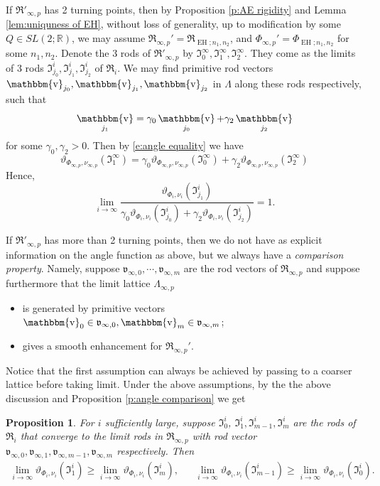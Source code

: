\documentclass[a4paper,11pt]{amsart}
\newtheorem{proposition}[theorem]{Proposition}
\theoremstyle{definition}
\numberwithin{equation}{section}
\newcommand{\R}{\mathbb{R}}
\newcommand{\mv} {\mathfrak v}
\newcommand{\mI} {\mathfrak I}
\newcommand{\mR} {\mathfrak R}
\DeclareMathOperator{\bbv}{\mathbbm{v}}
\DeclareMathOperator{\EH}{EH}
\begin{document}
If  $\mR'_{\infty, p}$ has 2 turning points, then  by Proposition \ref{p:AE rigidity} and Lemma \ref{lem:uniquness of EH}, without loss of generality, up to modification by some $Q\in SL(2;\R)$, we may assume $\mR_{\infty, p}'=\mR_{\EH; n_1, n_2}$, and $\Phi_{\infty,p}'=\Phi_{\EH;n_1, n_2}$ for some $n_1, n_2$.    Denote the 3 rods of $\mR'_{\infty, p}$ by $\mI^\infty_0, \mI^\infty_1, \mI^\infty_2$. They come as the limits of 3 rods $\mI_{j_0}^i, \mI_{j_1}^i, \mI_{j_2}^i$ of $\mR_i$. We may find primitive rod vectors $\bbv_{j_0}, \bbv_{j_1}, \bbv_{j_2}$ in $\Lambda$ along these rods respectively, such that 
\begin{equation}\label{e:primitive vector relations}
    \bbv_{j_1}=\gamma_0\bbv_{j_0}+\gamma_2\bbv_{j_2}
\end{equation}
for some $\gamma_0, \gamma_2>0$. Then by \eqref{e:angle equality} we have 
\begin{equation}
\vartheta_{\Phi_{\infty,p}, \nu_{\infty, p}}(\mI^\infty_1)=\gamma_0\vartheta_{\Phi_{\infty,p}, \nu_{\infty, p}}(\mI^\infty_0)+\gamma_2\vartheta_{\Phi_{\infty,p}, \nu_{\infty, p}}(\mI^\infty_2)
\end{equation}
Hence,
\begin{equation}\label{e:angle equality before limit}
    \lim_{i\rightarrow\infty}\frac{\vartheta_{\Phi_i, \nu_i}(\mI_{j_1}^i)}{\gamma_0\vartheta_{\Phi_i, \nu_i}(\mI_{j_0}^i)+\gamma_2\vartheta_{\Phi_i, \nu_i}(\mI_{j_2}^i)}=1.
\end{equation}

If $\mR'_{\infty, p}$ has more than 2 turning points, then we do not have as explicit information on the angle function as above, but we always  have a \emph{comparison property}. Namely, suppose $\mv_{\infty, 0}, \cdots, \mv_{\infty, m}$ are the rod vectors of $\mR_{\infty, p}$ and suppose furthermore that the 
limit lattice $\Lambda_{\infty,p}$ 
\begin{itemize}
    \item is generated by primitive vectors $\bbv_{0}\in\mv_{\infty,0},\bbv_{m}\in\mv_{\infty,m}$;
    \item gives a smooth enhancement for $\mR_{\infty, p}'$.
\end{itemize}
Notice that the first assumption can always be achieved by passing to a coarser lattice before taking limit. 
Under the above assumptions, by the the above discussion and Proposition \ref{p:angle comparison} we get
\begin{proposition}\label{p:angle comparision before limit}
    For $i$ sufficiently large, suppose $\mI_{0}^i$, $\mI_{1}^i, \mI_{m-1}^i, \mI_{m}^i$ are the rods of $\mR_i$ that converge to the limit rods in $\mR_{\infty,p}$ with rod vector $\mv_{\infty,0},\mv_{\infty, 1}, \mv_{\infty, m-1}, \mv_{\infty,m}$ respectively.
   Then 
    \begin{align}\label{e:angle comparision before limit AE}
         \lim_{i\rightarrow\infty}\vartheta_{\Phi_i, \nu_i}(\mI_1^i)\geq \lim_{i\to\infty}\vartheta_{\Phi_i, \nu_i}(\mI_m^i), &&
         \lim_{i\rightarrow\infty}\vartheta_{\Phi_i, \nu_i}(\mI_{m-1}^i)\geq 
         \lim_{i\to\infty}\vartheta_{\Phi_i, \nu_i}(\mI_0^i).
   \end{align}
\end{proposition}
\end{document}
